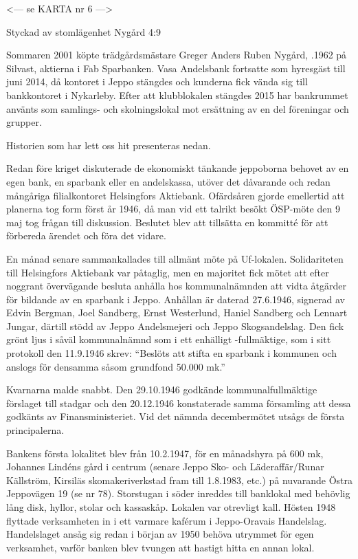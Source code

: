
<--- se KARTA nr 6 --->


Styckad av stomlägenhet Nygård 4:9

Sommaren 2001 köpte trädgårdsmästare Greger Anders Ruben	Nygård, .1962 på Silvast, aktierna i Fab Sparbanken. Vasa 	Andelsbank fortsatte som hyresgäst till juni 2014, då kontoret i Jeppo stängdes och kunderna fick vända sig till bankkontoret i Nykarleby. Efter att klubblokalen stängdes 2015 har bankrummet använts som samlings- och skolningslokal mot ersättning av en del föreningar och grupper.

Historien som har lett oss hit presenteras nedan.




Redan före kriget diskuterade de ekonomiskt tänkande jeppoborna behovet av en egen bank, en sparbank eller en andelskassa, utöver det dåvarande och redan mångåriga filialkontoret Helsingfors Aktiebank. Ofärdsåren gjorde emellertid att planerna tog form först år 1946, då man vid ett talrikt besökt ÖSP-möte den 9 maj tog frågan till diskussion. Beslutet blev att tillsätta en kommitté för att förbereda ärendet och föra det vidare.

En månad senare sammankallades till allmänt möte på Uf-lokalen. Solidariteten till Helsingfors Aktiebank var påtaglig, men en majoritet fick mötet att efter noggrant övervägande besluta anhålla hos kommunalnämnden att vidta åtgärder för bildande av en sparbank i Jeppo. Anhållan är daterad 27.6.1946, signerad av Edvin Bergman, Joel Sandberg, Ernst Westerlund, Haniel Sandberg och Lennart Jungar, därtill stödd av Jeppo Andelsmejeri och Jeppo Skogsandelslag. Den fick grönt ljus i såväl kommunalnämnd som i ett enhälligt -fullmäktige, som i sitt protokoll den 11.9.1946 skrev: ``Beslöts att stifta en sparbank i kommunen och anslogs för densamma såsom grundfond 50.000 mk.''

Kvarnarna malde snabbt. Den 29.10.1946 godkände kommunalfullmäktige förslaget till stadgar och den 20.12.1946 konstaterade samma församling att dessa godkänts av Finansministeriet. Vid det nämnda decembermötet utsågs de första principalerna.

Bankens första lokalitet blev från 10.2.1947, för en månadshyra på 600 mk, Johannes Lindéns gård i centrum (senare Jeppo Sko- och Läderaffär/Runar Källström, Kirsiläs skomakeriverkstad fram till 1.8.1983, etc.) på nuvarande Östra Jeppovägen 19 (se nr 78). Storstugan i söder inreddes till banklokal med behövlig lång disk, hyllor, stolar och kassaskåp. Lokalen var otrevligt kall. Hösten 1948 flyttade verksamheten in i ett varmare kaférum i Jeppo-Oravais Handelslag. Handelslaget ansåg sig redan i början av 1950 behöva utrymmet för egen verksamhet, varför banken blev tvungen att hastigt hitta en annan lokal.

